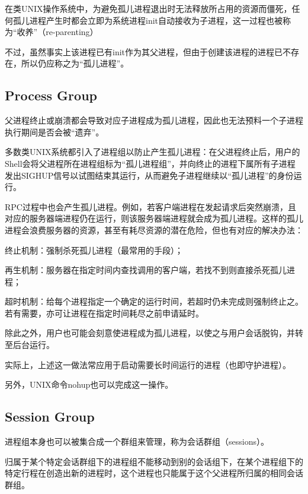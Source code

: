 在类UNIX操作系统中，为避免孤儿进程退出时无法释放所占用的资源而僵死，任何孤儿进程产生时都会立即为系统进程init自动接收为子进程，这一过程也被称为“收养”（re-parenting）

不过，虽然事实上该进程已有init作为其父进程，但由于创建该进程的进程已不存在，所以仍应称之为“孤儿进程”。

\subsection{Process Group}

父进程终止或崩溃都会导致对应子进程成为孤儿进程，因此也无法预料一个子进程执行期间是否会被“遗弃”。

多数类UNIX系统都引入了进程组以防止产生孤儿进程：在父进程终止后，用户的Shell会将父进程所在进程组标为“孤儿进程组”，并向终止的进程下属所有子进程发出SIGHUP信号以试图结束其运行，从而避免子进程继续以“孤儿进程”的身份运行。

RPC过程中也会产生孤儿进程。例如，若客户端进程在发起请求后突然崩溃，且对应的服务器端进程仍在运行，则该服务器端进程就会成为孤儿进程。这样的孤儿进程会浪费服务器的资源，甚至有耗尽资源的潜在危险，但也有对应的解决办法：

\begin{compactitem}
\item 终止机制：强制杀死孤儿进程（最常用的手段）；
\item 再生机制：服务器在指定时间内查找调用的客户端，若找不到则直接杀死孤儿进程；
\item 超时机制：给每个进程指定一个确定的运行时间，若超时仍未完成则强制终止之。若有需要，亦可让进程在指定时间耗尽之前申请延时。
\end{compactitem}

除此之外，用户也可能会刻意使进程成为孤儿进程，以使之与用户会话脱钩，并转至后台运行。

实际上，上述这一做法常应用于启动需要长时间运行的进程（也即守护进程）。

另外，UNIX命令nohup也可以完成这一操作。


\subsection{Session Group}


进程组本身也可以被集合成一个群组来管理，称为会话群组（sessions）。

归属于某个特定会话群组下的进程组不能移动到别的会话组下，在某个进程组下的特定行程在创造出新的进程时，这个进程也只能属于这个父进程所归属的相同会话群组。


